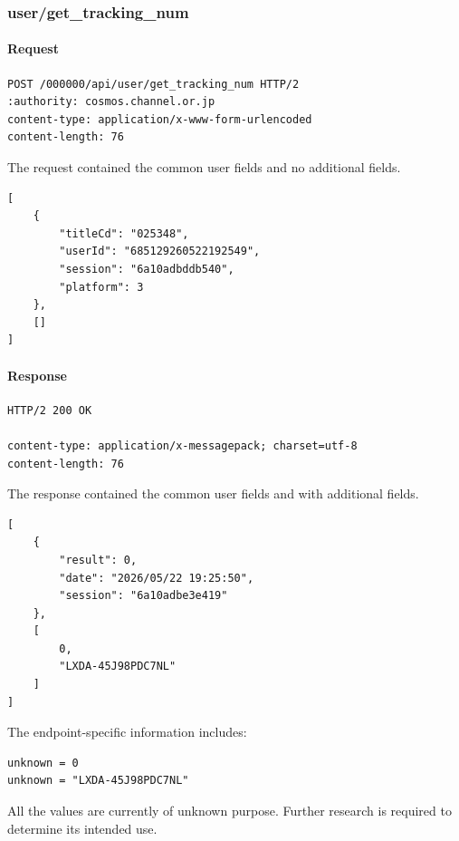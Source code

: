 \subsubsection{user/get\_tracking\_num}
\label{subsec:api_user_get_tracking_num}

\paragraph{Request}

\begin{lstlisting}
POST /000000/api/user/get_tracking_num HTTP/2
:authority: cosmos.channel.or.jp
content-type: application/x-www-form-urlencoded
content-length: 76
\end{lstlisting}

The request contained the common user fields and no additional fields.

\begin{lstlisting}
[
    {
        "titleCd": "025348",
        "userId": "685129260522192549",
        "session": "6a10adbddb540",
        "platform": 3
    },
    []
]
\end{lstlisting}

\paragraph{Response}

\begin{lstlisting}
HTTP/2 200 OK

content-type: application/x-messagepack; charset=utf-8
content-length: 76
\end{lstlisting}

The response contained the common user fields and with additional fields.

\begin{lstlisting}
[
    {
        "result": 0,
        "date": "2026/05/22 19:25:50",
        "session": "6a10adbe3e419"
    },
    [
        0,
        "LXDA-45J98PDC7NL"
    ]
]
\end{lstlisting}

The endpoint-specific information includes:

\begin{lstlisting}
unknown = 0
unknown = "LXDA-45J98PDC7NL"
\end{lstlisting}

\begin{tcolorbox}[colback=yellow!10,colframe=orange!80!black,title=Warning]
All the values are currently of unknown purpose.
Further research is required to determine its intended use.
\end{tcolorbox}

\newpage